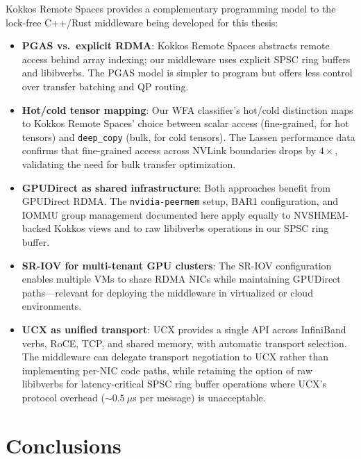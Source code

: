 \documentclass[11pt,letterpaper]{article}
\begin{document}
Kokkos Remote Spaces provides a complementary programming model to the lock-free C++/Rust middleware being developed for this thesis:

\begin{itemize}[noitemsep]
    \item \textbf{PGAS vs.\ explicit RDMA}: Kokkos Remote Spaces abstracts remote access behind array indexing; our middleware uses explicit SPSC ring buffers and libibverbs. The PGAS model is simpler to program but offers less control over transfer batching and QP routing.

    \item \textbf{Hot/cold tensor mapping}: Our WFA classifier's hot/cold distinction maps to Kokkos Remote Spaces' choice between scalar access (fine-grained, for hot tensors) and \texttt{deep\_copy} (bulk, for cold tensors). The Lassen performance data confirms that fine-grained access across NVLink boundaries drops by $4\times$, validating the need for bulk transfer optimization.

    \item \textbf{GPUDirect as shared infrastructure}: Both approaches benefit from GPUDirect RDMA. The \texttt{nvidia-peermem} setup, BAR1 configuration, and IOMMU group management documented here apply equally to NVSHMEM-backed Kokkos views and to raw libibverbs operations in our SPSC ring buffer.

    \item \textbf{SR-IOV for multi-tenant GPU clusters}: The SR-IOV configuration enables multiple VMs to share RDMA NICs while maintaining GPUDirect paths---relevant for deploying the middleware in virtualized or cloud environments.

    \item \textbf{UCX as unified transport}: UCX provides a single API across InfiniBand verbs, RoCE, TCP, and shared memory, with automatic transport selection. The middleware can delegate transport negotiation to UCX rather than implementing per-NIC code paths, while retaining the option of raw libibverbs for latency-critical SPSC ring buffer operations where UCX's protocol overhead (${\sim}0.5~\mu$s per message) is unacceptable.
\end{itemize}

\section{Conclusions}
\end{document}
